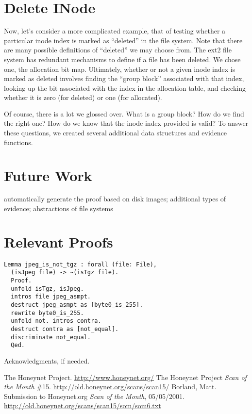 \documentclass[nocopyrightspace]{sigplanconf}
\begin{document}
\section{Delete INode}

Now, let's consider a more complicated example, that of testing whether a
particular inode index is marked as ``deleted'' in the file system. Note that
there are many possible definitions of ``deleted'' we may choose from. The
ext2 file system has redundant mechanisms to define if a file has been
deleted. We chose one, the allocation bit map. Ultimately, whether or not a
given inode index is marked as deleted involves finding the ``group block''
associated with that index, looking up the bit associated with the index in
the allocation table, and checking whether it is zero (for deleted) or one
(for allocated).

Of course, there is a lot we glossed over. What is a group block? How do we
find the right one? How do we know that the inode index provided is valid? To
answer these questions, we created several additional data structures and
evidence functions.

\section{Future Work}

automatically generate the proof based on disk images; additional types of
evidence; abstractions of file systems


\appendix
\section{Relevant Proofs}

\begin{lstlisting}
Lemma jpeg_is_not_tgz : forall (file: File),
  (isJpeg file) -> ~(isTgz file).
  Proof.
  unfold isTgz, isJpeg.
  intros file jpeg_asmpt.
  destruct jpeg_asmpt as [byte0_is_255].
  rewrite byte0_is_255.
  unfold not. intros contra.
  destruct contra as [not_equal].
  discriminate not_equal.
  Qed.
\end{lstlisting}

\acks

Acknowledgments, if needed.





\begin{thebibliography}{}
\softraggedright

The Honeynet Project. \url{http://www.honeynet.org/}
The Honeynet Project \emph{Scan of the Month} \#15.
\url{http://old.honeynet.org/scans/scan15/}
Borland, Matt. Submission to Honeynet.org \emph{Scan of the Month},
05/05/2001. \url{http://old.honeynet.org/scans/scan15/som/som6.txt}

\end{thebibliography}
\end{document}
